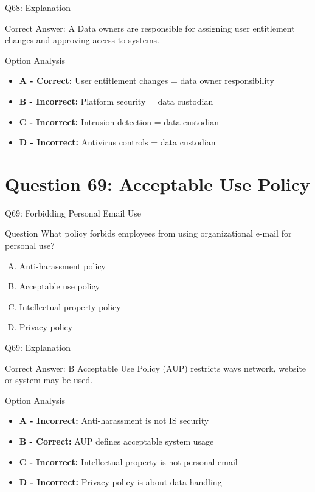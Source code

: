 \documentclass{beamer}
\begin{document}
	\begin{frame}{Q68: Explanation}
		\begin{block}{Correct Answer: A}
			Data owners are responsible for assigning user entitlement changes and approving access to systems.
		\end{block}
		\begin{block}{Option Analysis}
			\begin{itemize}
				\item \textbf{A - Correct:} User entitlement changes = data owner responsibility
				\item \textbf{B - Incorrect:} Platform security = data custodian
				\item \textbf{C - Incorrect:} Intrusion detection = data custodian
				\item \textbf{D - Incorrect:} Antivirus controls = data custodian
			\end{itemize}
		\end{block}
	\end{frame}
	
	\section{Question 69: Acceptable Use Policy}
	
	\begin{frame}{Q69: Forbidding Personal Email Use}
		\begin{block}{Question}
			What policy forbids employees from using organizational e-mail for personal use?
		\end{block}
		\begin{enumerate}[(A)]
			\item Anti-harassment policy
			\item Acceptable use policy
			\item Intellectual property policy
			\item Privacy policy
		\end{enumerate}
	\end{frame}
	
	\begin{frame}{Q69: Explanation}
		\begin{block}{Correct Answer: B}
			Acceptable Use Policy (AUP) restricts ways network, website or system may be used.
		\end{block}
		\begin{block}{Option Analysis}
			\begin{itemize}
				\item \textbf{A - Incorrect:} Anti-harassment is not IS security
				\item \textbf{B - Correct:} AUP defines acceptable system usage
				\item \textbf{C - Incorrect:} Intellectual property is not personal email
				\item \textbf{D - Incorrect:} Privacy policy is about data handling
			\end{itemize}
		\end{block}
	\end{frame}
	
\end{document}
